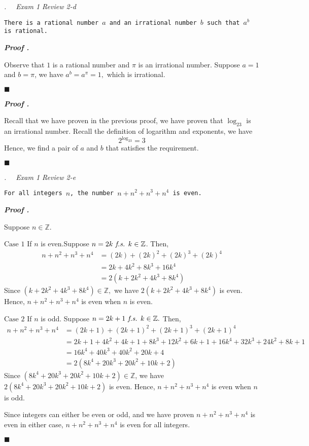 \documentclass[11pt,letter]{article}
\newcounter{nq}[section]
\newcounter{np}[section]
\newenvironment*{p}{\par\noindent\textbf{\textit{Proof \stepcounter{np}\thenp. }}\par}{\par\hfill $\blacksquare$\par}
\newenvironment*{q}[1]{\noindent\emph{\thesection.\stepcounter{nq}\thenq$\quad $ #1}\par\noindent\texttt}{}
\def\Z{{\mathbb{Z}}}
\def\fs{\emph{ f.s. }}
\begin{document}
\begin{framed}\begin{q}
	{Exam 1 Review 2-d}
	{There is a rational number $a$ and an irrational number $b$ such that $a^b$ is rational.}
\end{q}\end{framed}
\begin{p}
	Observe that $1$ is a rational number and $\pi$ is an irrational number.  Suppose $a=1$ and $b=\pi$, we have $a^b=a^\pi=1,$ which is irrational.	
\end{p}
\begin{p}
	Recall that we have proven in the previous proof, we have proven that $\log_23$ is an irrational number. Recall the definition of logarithm and exponents, we have \[2^{\log_23}=3\] Hence, we find a pair of $a$ and $b$ that  satisfies the requirement. 
\end{p}

\begin{framed}\begin{q}
	{Exam 1 Review 2-e}
	{For all integers $n$, the number $n+n^2+n^3+n^4$ is even.}
\end{q}\end{framed}
\begin{p}
	Suppose $n\in\Z$.\par
	$\boxed{\text{Case }1}$ If $n$ is even.Suppose $n=2k\fs k\in\Z$. Then,\[\begin{aligned}n+n^2+n^3+n^4&=(2k)+(2k)^2+(2k)^3+(2k)^4\\&=2k+4k^2+8k^3+16k^4\\&=2(k+2k^2+4k^3+8k^4)\end{aligned}\] Since $(k+2k^2+4k^3+8k^4)\in\Z,$ we have $2(k+2k^2+4k^3+8k^4)$ is even. Hence, $n+n^2+n^3+n^4$ is even when $n$ is even.\par
	$\boxed{\text{Case }2}$ If $n$ is odd. Suppose $n=2k+1\fs k\in\Z.$ Then, \[\begin{aligned}n+n^2+n^3+n^4&=(2k+1)+(2k+1)^2+(2k+1)^3+(2k+1)^4\\&=2k+1+4k^2+4k+1+8k^3+12k^2+6k+1+16k^4+32k^3+24k^2+8k+1\\&=16k^4+40k^3+40k^2+20k+4\\&=2(8k^4+20k^3+20k^2+10k+2)\end{aligned}\] Since $(8k^4+20k^3+20k^2+10k+2)\in\Z$, we have $2(8k^4+20k^3+20k^2+10k+2)$ is even. Hence, $n+n^2+n^3+n^4$ is even when $n$ is odd.\par 
	Since integers can either be even or odd, and we have proven $n+n^2+n^3+n^4$ is even in either case, $n+n^2+n^3+n^4$ is even for all integers. 
\end{p}
\end{document}
